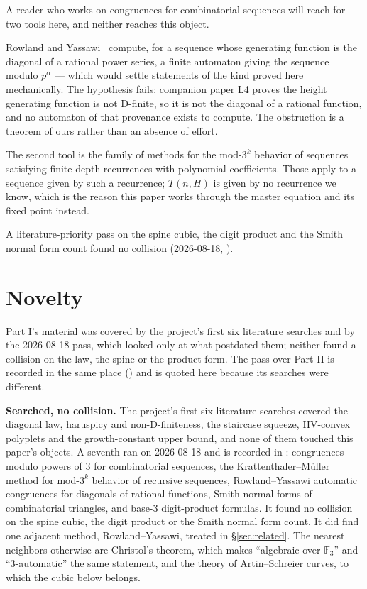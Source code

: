 \documentclass[11pt]{article}
\newcommand{\F}{\mathbb{F}}
\begin{document}
A reader who works on congruences for combinatorial sequences will reach for two
tools here, and neither reaches this object.

Rowland and Yassawi~\cite{rowlandYassawi2015} compute, for a sequence whose
generating function is the diagonal of a rational power series, a finite
automaton giving the sequence modulo $p^\alpha$ --- which would settle statements
of the kind proved here mechanically. The hypothesis fails: companion paper L4
proves the height generating function is not D-finite, so it is not the diagonal
of a rational function, and no automaton of that provenance exists to compute.
The obstruction is a theorem of ours rather than an absence of effort.

The second tool is the family of methods for the mod-$3^k$ behavior of
sequences satisfying finite-depth recurrences with polynomial coefficients.
Those apply to a sequence given by such a recurrence; $T(n,H)$ is given by no
recurrence we know, which is the reason this paper works through the master
equation and its fixed point instead.

A literature-priority pass on the spine cubic, the digit product and the Smith
normal form count found no collision (2026-08-18,
).

\section{Novelty}
\label{sec:novelty}

Part I's material was covered by the project's first six literature
searches and by the 2026-08-18 pass, which looked only at what postdated them;
neither found a collision on the law, the spine or the product form. The pass
over Part II is recorded in the same place
() and is quoted here because its
searches were different.


\textbf{Searched, no collision.} The project's first six literature searches covered
the diagonal law, haruspicy and non-D-finiteness, the staircase squeeze,
HV-convex polyplets and the growth-constant upper bound, and none of them
touched this paper's objects. A seventh ran on 2026-08-18 and is recorded in
: congruences modulo powers of $3$ for
combinatorial sequences, the Krattenthaler--M\"uller method for mod-$3^k$
behavior of recursive sequences, Rowland--Yassawi automatic congruences for
diagonals of rational functions, Smith normal forms of combinatorial triangles,
and base-$3$ digit-product formulas. It found no collision on the spine cubic,
the digit product or the Smith normal form count. It did find one
adjacent method, Rowland--Yassawi, treated in \S\ref{sec:related}. The nearest
neighbors otherwise are Christol's theorem, which makes ``algebraic over
$\F_3$'' and ``$3$-automatic'' the same statement, and the theory of
Artin--Schreier curves, to which the cubic below belongs.
\end{document}
